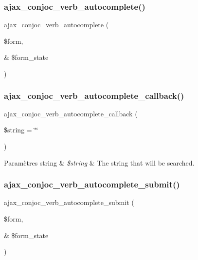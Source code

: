 \subsubsection{\texorpdfstring{ajax\+\_\+conjoc\+\_\+verb\+\_\+autocomplete()}{ajax\_conjoc\_verb\_autocomplete()}}
{\footnotesize\ttfamily ajax\+\_\+conjoc\+\_\+verb\+\_\+autocomplete (\begin{DoxyParamCaption}\item[{}]{\$form,  }\item[{\&}]{\$form\+\_\+state }\end{DoxyParamCaption})}

\hypertarget{php_2conjoc__web_form_8inc_a5ea54e98ecadf55b7fe917fe6237a52e}{}\label{php_2conjoc__web_form_8inc_a5ea54e98ecadf55b7fe917fe6237a52e} 
\subsubsection{\texorpdfstring{ajax\+\_\+conjoc\+\_\+verb\+\_\+autocomplete\+\_\+callback()}{ajax\_conjoc\_verb\_autocomplete\_callback()}}
{\footnotesize\ttfamily ajax\+\_\+conjoc\+\_\+verb\+\_\+autocomplete\+\_\+callback (\begin{DoxyParamCaption}\item[{}]{\$string = {\ttfamily \char`\"{}\char`\"{}} }\end{DoxyParamCaption})}


\begin{DoxyParams}[1]{Paramètres}
string & {\em \$string} & The string that will be searched. \\
\hline
\end{DoxyParams}
\hypertarget{php_2conjoc__web_form_8inc_add934c4187ded056db9c8369764a51ed}{}\label{php_2conjoc__web_form_8inc_add934c4187ded056db9c8369764a51ed} 
\subsubsection{\texorpdfstring{ajax\+\_\+conjoc\+\_\+verb\+\_\+autocomplete\+\_\+submit()}{ajax\_conjoc\_verb\_autocomplete\_submit()}}
{\footnotesize\ttfamily ajax\+\_\+conjoc\+\_\+verb\+\_\+autocomplete\+\_\+submit (\begin{DoxyParamCaption}\item[{}]{\$form,  }\item[{\&}]{\$form\+\_\+state }\end{DoxyParamCaption})}

